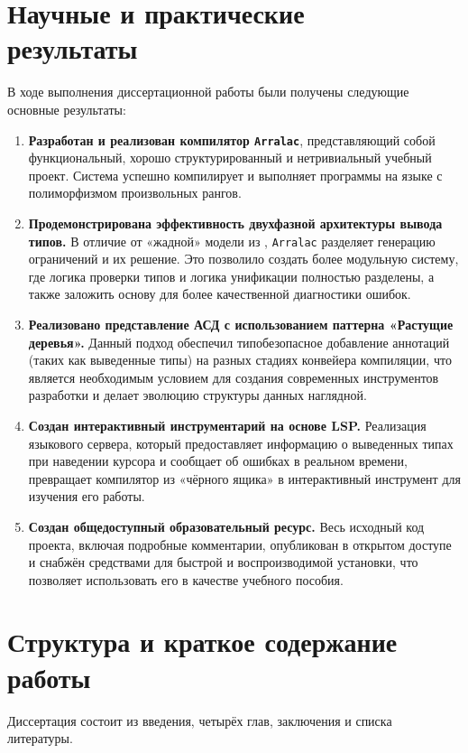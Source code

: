 \chapter{Научные и практические \\ результаты}
В ходе выполнения диссертационной работы были получены следующие основные результаты:
\begin{enumerate}
    \item \textbf{Разработан и реализован компилятор \texttt{Arralac}}, представляющий собой функциональный, хорошо структурированный и нетривиальный учебный проект. Система успешно компилирует и выполняет программы на языке с полиморфизмом произвольных рангов.
    \item \textbf{Продемонстрирована эффективность двухфазной архитектуры вывода типов.} В отличие от «жадной» модели из \cite{jones-practical-2007}, \texttt{Arralac} разделяет генерацию ограничений и их решение. Это позволило создать более модульную систему, где логика проверки типов и логика унификации полностью разделены, а также заложить основу для более качественной диагностики ошибок.
    \item \textbf{Реализовано представление АСД с использованием паттерна «Растущие деревья».} Данный подход обеспечил типобезопасное добавление аннотаций (таких как выведенные типы) на разных стадиях конвейера компиляции, что является необходимым условием для создания современных инструментов разработки и делает эволюцию структуры данных наглядной.
    \item \textbf{Создан интерактивный инструментарий на основе LSP.} Реализация языкового сервера, который предоставляет информацию о выведенных типах при наведении курсора и сообщает об ошибках в реальном времени, превращает компилятор из «чёрного ящика» в интерактивный инструмент для изучения его работы.
    \item \textbf{Создан общедоступный образовательный ресурс.} Весь исходный код проекта, включая подробные комментарии, опубликован в открытом доступе и снабжён средствами для быстрой и воспроизводимой установки, что позволяет использовать его в качестве учебного пособия.
\end{enumerate}

\chapter{Структура и краткое содержание \\ работы}

Диссертация состоит из введения, четырёх глав, заключения и списка литературы.


